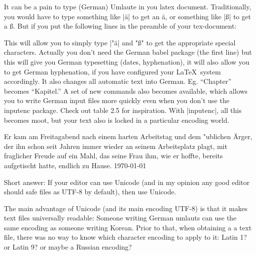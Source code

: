 It can be a pain to type (German) Umlaute in you latex document. Traditionally, you would have to type something like |{\"a}| to get an ä, or something like |\ss{}| to get a \ss. But if you put the following lines in the preamble of your tex-document:



This will allow you to simply type |"ä| and "ß" to get the appropriate special characters. Actually you don't need the German babel package (the first line) but this will give you German typesetting (dates, hyphenation), it will also allow you to get German hyphenation, if you have configured your \LaTeX\ system accordingly. It also changes all automatic text into German. Eg. “Chapter” becomes “Kapitel.” A set of new commands also becomes available, which allows you to write German input files more quickly even when you don’t use the inputenc package. Check out table 2.5 for inspiration. With |inputenc|, all this becomes moot, but your text also is locked in a particular encoding world.

\addvspace{10pt}

\brule

\begin{center}
\begin{minipage}{8cm}
\textbf{\chaptername}

Er kam am Freitagabend nach einem harten Arbeitstag und dem "ublichen Ärger, der ihn schon seit Jahren immer wieder an seinem Arbeitsplatz plagt, mit fraglicher Freude auf ein Mahl, das seine Frau ihm, wie er hoffte, bereits aufgetischt hatte, endlich zu Hause. 
\hfill\hfill \today
\end{minipage}
\end{center}



Short answer: If your editor can use Unicode (and in my opinion any good editor should safe files as UTF-8 by default), then use Unicode.

The main advantage of Unicode (and its main encoding UTF-8) is that it makes text files universally readable: Someone writing German umlauts can use the same encoding as someone writing Korean. Prior to that, when obtaining a a text file, there was no way to know which character encoding to apply to it: Latin 1? or Latin 9? or maybe a Russian encoding?

